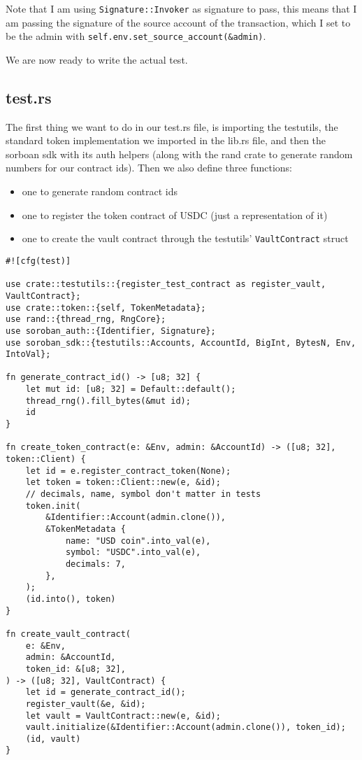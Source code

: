 \documentclass{article}
\newcommand{\inl}[1]{\lstinline{#1}}
\begin{document}
Note that I am using \inl{Signature::Invoker} as signature to pass, this means that I am passing the signature of the source account of the transaction, which I set to be the admin with \inl{self.env.set_source_account(&admin)}.

We are now ready to write the actual test.

\subsection{test.rs}
The first thing we want to do in our test.rs file, is importing the testutils, the standard token implementation we imported in the lib.rs file, and then the sorboan sdk with its auth helpers (along with the rand crate to generate random numbers for our contract ids). Then we also define three functions:

\begin{itemize}
\item one to generate random contract ids
\item one to register the token contract of USDC (just a representation of it)
\item one to create the vault contract through the testutils' \inl{VaultContract} struct
\end{itemize}

\begin{lstlisting}
#![cfg(test)]

use crate::testutils::{register_test_contract as register_vault, VaultContract};
use crate::token::{self, TokenMetadata};
use rand::{thread_rng, RngCore};
use soroban_auth::{Identifier, Signature};
use soroban_sdk::{testutils::Accounts, AccountId, BigInt, BytesN, Env, IntoVal};

fn generate_contract_id() -> [u8; 32] {
    let mut id: [u8; 32] = Default::default();
    thread_rng().fill_bytes(&mut id);
    id
}

fn create_token_contract(e: &Env, admin: &AccountId) -> ([u8; 32], token::Client) {
    let id = e.register_contract_token(None);
    let token = token::Client::new(e, &id);
    // decimals, name, symbol don't matter in tests
    token.init(
        &Identifier::Account(admin.clone()),
        &TokenMetadata {
            name: "USD coin".into_val(e),
            symbol: "USDC".into_val(e),
            decimals: 7,
        },
    );
    (id.into(), token)
}

fn create_vault_contract(
    e: &Env,
    admin: &AccountId,
    token_id: &[u8; 32],
) -> ([u8; 32], VaultContract) {
    let id = generate_contract_id();
    register_vault(&e, &id);
    let vault = VaultContract::new(e, &id);
    vault.initialize(&Identifier::Account(admin.clone()), token_id);
    (id, vault)
}
\end{lstlisting}
\end{document}
